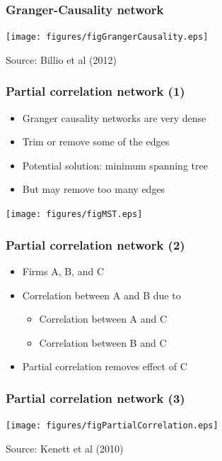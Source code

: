 \documentclass[aspectratio=43,dvipsnames,usenames, svgnames]{beamer}
\begin{document}
\begin{frame} %
\frametitle{Granger-Causality network}
\begin{center}
	\texttt{[image: figures/figGrangerCausality.eps]}
\end{center}
\tiny{Source: Billio et al (2012)}
\end{frame}

\begin{frame} %
\frametitle{Partial correlation network (1)}
\begin{itemize}
	\item Granger causality networks are very dense
	\smallskip
	\item Trim or remove some of the edges
	\smallskip
	\item Potential solution: minimum spanning tree
	\smallskip
	\item But may remove too many edges
\end{itemize}
\begin{center}
\texttt{[image: figures/figMST.eps]}
\end{center}
\end{frame}

\begin{frame} %
\frametitle{Partial correlation network (2)}
\begin{itemize}
	\item Firms A, B, and C
	\smallskip
	\item Correlation between A and B due to
		\begin{itemize}
			\item Correlation between A and C
			\item Correlation between B and C
		\end{itemize}
	\smallskip
	\item Partial correlation removes effect of C
\end{itemize}
\end{frame}

\begin{frame} %
\frametitle{Partial correlation network (3)}
\begin{center}
	\texttt{[image: figures/figPartialCorrelation.eps]}
\end{center}
\tiny{Source: Kenett et al (2010)}
\end{frame}
\end{document}
